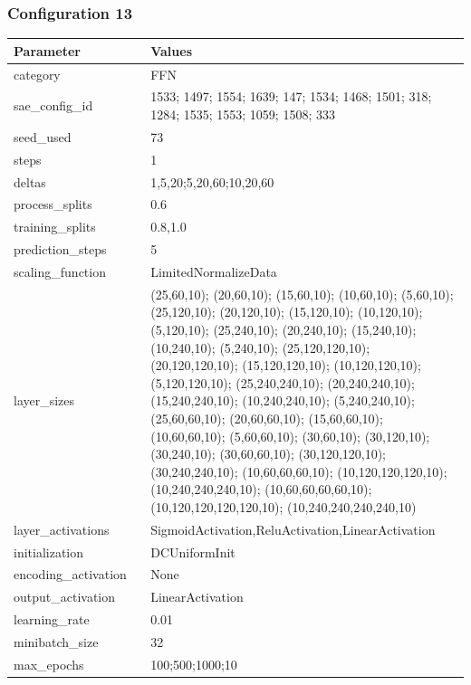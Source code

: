 \documentclass[a4paper,11pt,oneside]{article}
\theoremstyle{plain}
\theoremstyle{definition}
\begin{document}
	\subsubsection{Configuration 13}\label{config13}
	\begin{longtable}[H]{|p{0.3\linewidth}|p{0.7\linewidth}|} \hline 			\rowcolor{beaublue}\textbf{Parameter} &\textbf{Values} \\\hline{category} & {FFN} \\\hline
		{sae\_config\_id} & {1533; 1497; 1554; 1639; 147; 1534; 1468; 1501; 318; 1284; 1535; 1553; 1059; 1508; 333} \\\hline
		{seed\_used} & {73} \\\hline
		{steps} & {1} \\\hline
		{deltas} & {1,5,20;5,20,60;10,20,60} \\\hline
		{process\_splits} & {0.6} \\\hline
		{training\_splits} & {0.8,1.0} \\\hline
		{prediction\_steps} & {5} \\\hline
		{scaling\_function} & {LimitedNormalizeData} \\\hline
		{layer\_sizes} & {(25,60,10); (20,60,10); (15,60,10); (10,60,10); (5,60,10); (25,120,10); (20,120,10); (15,120,10); (10,120,10); (5,120,10); (25,240,10); (20,240,10); (15,240,10); (10,240,10); (5,240,10); (25,120,120,10); (20,120,120,10); (15,120,120,10); (10,120,120,10); (5,120,120,10); (25,240,240,10); (20,240,240,10); (15,240,240,10); (10,240,240,10); (5,240,240,10); (25,60,60,10); (20,60,60,10); (15,60,60,10); (10,60,60,10); (5,60,60,10); (30,60,10); (30,120,10); (30,240,10); (30,60,60,10); (30,120,120,10); (30,240,240,10); (10,60,60,60,10); (10,120,120,120,10); (10,240,240,240,10); (10,60,60,60,60,10); (10,120,120,120,120,10); (10,240,240,240,240,10)} \\\hline
		{layer\_activations} & {SigmoidActivation,ReluActivation,LinearActivation} \\\hline
		{initialization} & {DCUniformInit} \\\hline
		{encoding\_activation} & {None} \\\hline
		{output\_activation} & {LinearActivation} \\\hline
		{learning\_rate} & {0.01} \\\hline
		{minibatch\_size} & {32} \\\hline
		{max\_epochs} & {100;500;1000;10} \\\hline

\end{longtable}
\end{document}
